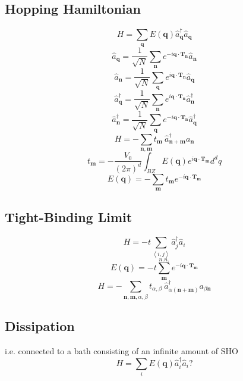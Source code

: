 \documentclass[12pt]{extarticle}
\newcommand{\average}[1]{\ensuremath{\left\langle #1 \right\rangle}}
\newcommand{\creation}[1]{\hat{#1}^{\dagger}}
\begin{document}
\begin{multicols*}{2}
\subsection{Hopping Hamiltonian}
$$H= \sum_{\mathbf{q}} E(\mathbf{q}) \creation{a}_{\mathbf{q}} \hat{a}_{\mathbf{q}}$$
$$\hat{a}_{\mathbf{q}}= \dfrac{1}{\sqrt{N}} \sum_{\mathbf{n}} e^{-i \mathbf{q} \cdot \mathbf{T_n}} \hat{a}_{\mathbf{n}}$$
$$\hat{a}_{\mathbf{n}}= \dfrac{1}{\sqrt{N}} \sum_{\mathbf{q}} e^{i \mathbf{q} \cdot \mathbf{T_n}} \hat{a}_{\mathbf{q}}$$
$$\creation{a}_{\mathbf{q}}= \dfrac{1}{\sqrt{N}} \sum_{\mathbf{n}} e^{i \mathbf{q} \cdot \mathbf{T_n}} \creation{a}_{\mathbf{n}}$$
$$\creation{a}_{\mathbf{n}}= \dfrac{1}{\sqrt{N}} \sum_{\mathbf{q}} e^{-i \mathbf{q} \cdot \mathbf{T_n}} \creation{a}_{\mathbf{q}}$$
$$H=- \sum_{\mathbf{n},\mathbf{m}}  t_{\mathbf{m}} \: \creation{a}_{\mathbf{n+m}} a_{\mathbf{n}}$$
$$t_{\mathbf{m}}=-\dfrac{V_0}{(2\pi)^d}\int_{BZ} E(\mathbf{q}) e^{i \textbf{q} \cdot \mathbf{T_m}} d^dq$$
$$E(\mathbf{q})= -\sum_{\mathbf{m}} t_{\mathbf{m}} e^{-i \mathbf{q} \cdot \mathbf{T_m}}$$

\subsection{Tight-Binding Limit}
$$H= -t \sum_{\average{i,j}} \creation{a}_{j} \hat{a}_{i}$$
$$E(\mathbf{q})= -t\sum_{\mathbf{m}}^{n.n.} e^{-i \mathbf{q} \cdot \mathbf{T_m}}$$
$$H=- \sum_{\mathbf{n},\mathbf{m}, \alpha, \beta}  t_{\alpha, \beta} \: \creation{a}_{\alpha(\mathbf{n+m})} a_{\beta \mathbf{n}}$$

\subsection{Dissipation}
i.e. connected to a bath consisting of an infinite amount of SHO
$$H= \sum_{i} E(\mathbf{q}) \creation{a}_{i} \hat{a}_{i}?$$


\end{multicols*}
\end{document}
